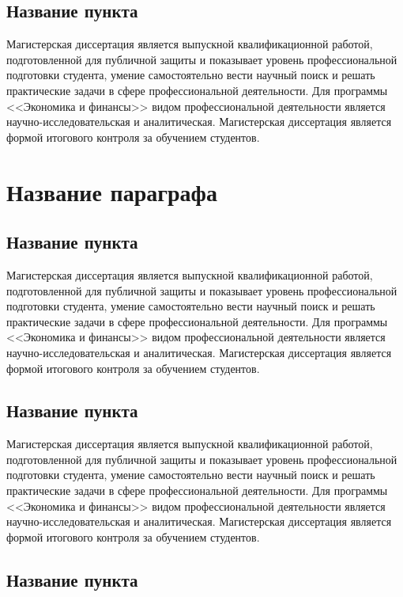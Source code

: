 \documentclass[12pt,a4paper, oneside]{extreport}
\begin{document}
\subsection{Название пункта}

Магистерская диссертация является выпускной квалификационной работой, подготовленной для публичной защиты и показывает уровень профессиональной подготовки студента, умение самостоятельно вести научный поиск и решать практические задачи в сфере профессиональной деятельности. Для программы <<Экономика и финансы>> видом профессиональной деятельности является научно-исследовательская и аналитическая. Магистерская диссертация является формой итогового контроля за обучением студентов.

\section{Название параграфа}

\subsection{Название пункта}

Магистерская диссертация является выпускной квалификационной работой, подготовленной для публичной защиты и показывает уровень профессиональной подготовки студента, умение самостоятельно вести научный поиск и решать практические задачи в сфере профессиональной деятельности. Для программы <<Экономика и финансы>> видом профессиональной деятельности является научно-исследовательская и аналитическая. Магистерская диссертация является формой итогового контроля за обучением студентов.

\subsection{Название пункта}

Магистерская диссертация является выпускной квалификационной работой, подготовленной для публичной защиты и показывает уровень профессиональной подготовки студента, умение самостоятельно вести научный поиск и решать практические задачи в сфере профессиональной деятельности. Для программы <<Экономика и финансы>> видом профессиональной деятельности является научно-исследовательская и аналитическая. Магистерская диссертация является формой итогового контроля за обучением студентов.

\subsection{Название пункта}
\end{document}
